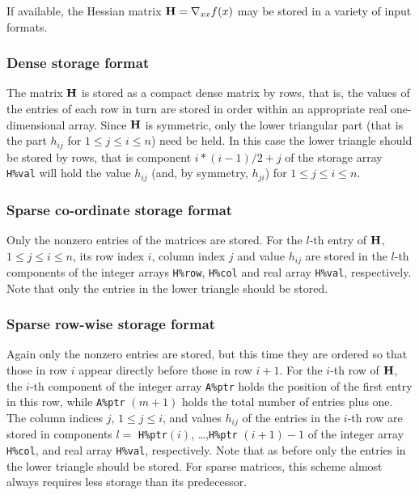 \documentclass{galahad}
\begin{document}

\galmatrix
If available, the Hessian matrix ${\mathbf{H}} = \nabla_{xx} f(x)$
may be stored in a variety of input formats.

\subsubsection{Dense storage format}\label{dense}
The matrix ${\mathbf{H}}$ is stored as a compact
dense matrix by rows, that is, the values of the entries of each row in turn are
stored in order within an appropriate real one-dimensional array.
Since ${\mathbf{H}}$ is symmetric, only the lower triangular part (that is the part
$h_{ij}$ for $1 \leq j \leq i \leq n$) need be held. In this case
the lower triangle should be stored by rows, that is
component $i \ast (i-1)/2 + j$ of the storage array {\tt H\%val}
will hold the value $h_{ij}$ (and, by symmetry, $h_{ji}$)
for $1 \leq j \leq i \leq n$.

\subsubsection{Sparse co-ordinate storage format}\label{coordinate}
Only the nonzero entries of the matrices are stored.
For the $l$-th entry of ${\mathbf{H}}$, $1 \leq j \leq i \leq n$,
its row index $i$, column index $j$ and value $h_{ij}$
are stored in the $l$-th components of the integer arrays {\tt H\%row},
{\tt H\%col} and real array {\tt H\%val}, respectively.
Note that only the entries in the lower triangle should be stored.

\subsubsection{Sparse row-wise storage format}\label{rowwise}
Again only the nonzero entries are stored, but this time
they are ordered so that those in row $i$ appear directly before those
in row $i+1$. For the $i$-th row of ${\mathbf{H}}$, the $i$-th component of the
integer array {\tt A\%ptr} holds the position of the first entry in this row,
while {\tt A\%ptr} $(m+1)$ holds the total number of entries plus one.
The column indices $j$, $1 \leq j \leq i$, and values $h_{ij}$ of the
entries in the $i$-th row are stored in components
$l =$ {\tt H\%ptr}$(i)$, \ldots ,{\tt H\%ptr} $(i+1)-1$ of the
integer array {\tt H\%col}, and real array {\tt H\%val}, respectively.
Note that as before only the entries in the lower triangle should be stored.
For sparse matrices, this scheme almost always requires less storage than
its predecessor.
\end{document}
